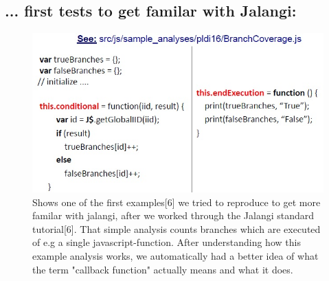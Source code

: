 \documentclass[a4paper]{scrartcl}
\begin{document}
\subsection{... first tests to get familar with Jalangi:}
\begin{figure}[!htb]
	\centering
	\includegraphics[width=0.8\linewidth]{FirstSampleAnalysis.jpg}
	\caption{Shows one of the first examples[6] we tried to reproduce to get more familar with jalangi, after we worked through the Jalangi standard tutorial[6]. That simple analysis counts branches which are executed of e.g a single javascript-function. After understanding how this example analysis works, we automatically had a better idea of what the term "callback function" actually means and what it does.}
	\label{img:grafik-dummy}
\end{figure}
\newpage
\end{document}
